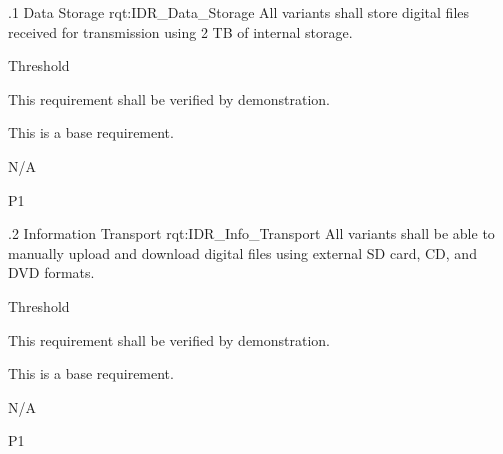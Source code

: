 \ONERQMTVKSA
{\RqtNumberBase.1}
{Data Storage}
{rqt:IDR_Data_Storage}
{All \ThisSystem variants shall store digital files received for transmission using 2 TB of internal storage.}
{
	\item [Phase 1] Threshold
}
{This requirement shall be verified by demonstration.}
{
\item [N/A] This is a base requirement.
}
{
	\item N/A
}
{P1}


\ONERQMTVKSA
{\RqtNumberBase.2}
{Information Transport}
{rqt:IDR_Info_Transport}
{All \ThisSystem variants shall be able to manually upload and download digital files using external SD card, CD, and DVD formats.}
{
	\item [Phase 1] Threshold
}
{This requirement shall be verified by demonstration.}
{
\item [N/A] This is a base requirement.
}
{
	\item N/A
}
{P1}
